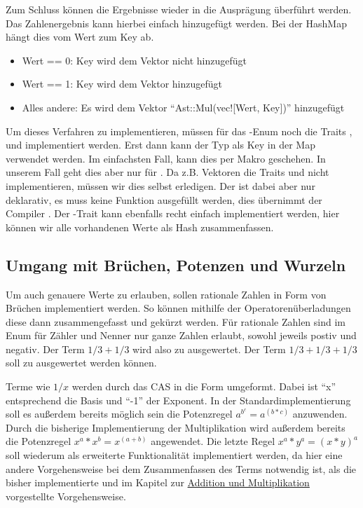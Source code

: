 \documentclass[11pt,a4paper, ngerman]{article}
\begin{document}
Zum Schluss können die Ergebnisse wieder in die Ausprägung  überführt werden. Das Zahlenergebnis kann hierbei einfach hinzugefügt werden. Bei der HashMap hängt dies vom Wert zum Key ab. 

\begin{itemize}
    \item Wert == 0: Key wird dem Vektor nicht hinzugefügt
    \item Wert == 1: Key wird dem Vektor hinzugefügt
    \item Alles andere: Es wird dem Vektor ``Ast::Mul(vec![Wert, Key])'' hinzugefügt
\end{itemize}

Um dieses Verfahren zu implementieren, müssen für das -Enum noch die Traits ,  und  implementiert werden. Erst dann kann der Typ  als Key in der Map verwendet werden. Im einfachsten Fall, kann dies per Makro geschehen. In unserem Fall geht dies aber nur für . Da z.B. Vektoren die Traits  und  nicht implementieren, müssen wir dies selbst erledigen. Der  ist dabei aber nur deklarativ, es muss keine Funktion ausgefüllt werden, dies übernimmt der Compiler \cite{RustEqTrait}. Der -Trait kann ebenfalls recht einfach implementiert werden, hier können wir alle vorhandenen Werte als Hash zusammenfassen.

\subsection{Umgang mit Brüchen, Potenzen und Wurzeln}
Um auch genauere Werte zu erlauben, sollen rationale Zahlen in Form von Brüchen implementiert werden. So können mithilfe der Operatorenüberladungen diese dann zusammengefasst und gekürzt werden. Für rationale Zahlen sind im Enum  für Zähler und Nenner nur ganze Zahlen erlaubt, sowohl jeweils postiv und negativ. Der Term $1/3+1/3$ wird also zu  ausgewertet. Der Term $1/3+1/3+1/3$ soll zu  ausgewertet werden können.

Terme wie $1/x$ werden durch das CAS in die Form  umgeformt. Dabei ist ``x'' entsprechend die Basis und ``-1'' der Exponent. In der Standardimplementierung soll es außerdem bereits möglich sein die Potenzregel $a^{b^{c}} = a^{(b*c)}$ anzuwenden. Durch die bisherige Implementierung der Multiplikation wird außerdem bereits die Potenzregel $x^a*x^b = x^{(a+b)}$ angewendet. Die letzte Regel $x^a*y^a = (x*y)^a$ soll wiederum als erweiterte Funktionalität implementiert werden, da hier eine andere Vorgehensweise bei dem Zusammenfassen des Terms notwendig ist, als die bisher implementierte und im Kapitel zur \hyperref[sec:kapAddnundMult]{Addition und Multiplikation} vorgestellte Vorgehensweise.
\end{document}
